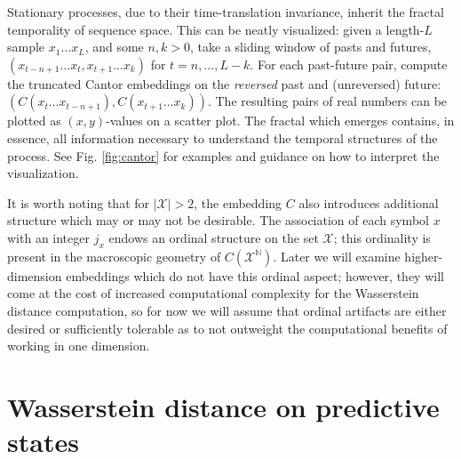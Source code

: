 \documentclass[sigconf, anonymous, review]{acmart}
\begin{document}
Stationary processes, due to their time-translation invariance, inherit the
fractal temporality of sequence space. This can be neatly visualized: given a
length-$L$ sample $x_1\dots x_L$, and some $n,k>0$, take a sliding window of
pasts and futures, $(x_{t-n+1}\dots x_t, x_{t+1}\dots x_k)$ for $t=n,\dots,L-k$.
For each past-future pair, compute the truncated Cantor embeddings on the
\emph{reversed} past and (unreversed) future: $\left(C(x_t \dots
x_{t-n+1}),C(x_{t+1}\dots x_k)\right)$. The resulting pairs of real numbers can
be plotted as $(x,y)$-values on a scatter plot. The fractal which emerges
contains, in essence, all information necessary to understand the temporal
structures of the process. See Fig. \ref{fig:cantor} for examples and guidance
on how to interpret the visualization.

It is worth noting that for $|\mathcal{X}|>2$, the embedding $C$ also introduces
additional structure which may or may not be desirable. The association of each
symbol $x$ with an integer $j_x$ endows an ordinal structure on the set
$\mathcal{X}$; this ordinality is present in the macroscopic geometry of
$C\left(\mathcal{X}^{\mathbb{N}}\right)$. Later we will examine higher-dimension
embeddings which do not have this ordinal aspect; however, they will come at the
cost of increased computational complexity for the Wasserstein distance
computation, so for now we will assume that ordinal artifacts are either desired
or sufficiently tolerable as to not outweight the computational benefits of
working in one dimension.

\section{Wasserstein distance on predictive states}
\end{document}

